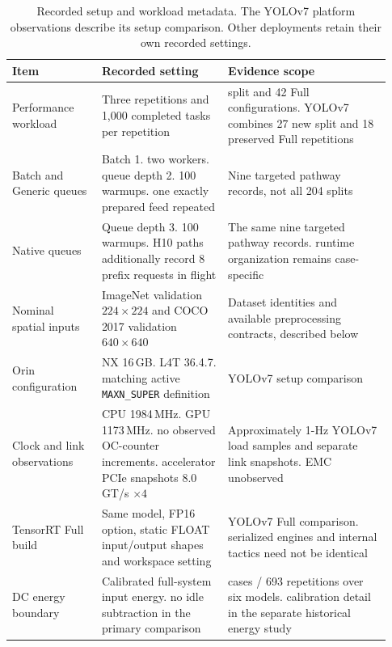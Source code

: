 \begin{table}[t]
\centering\small
\caption{Recorded setup and workload metadata. The YOLOv7 platform observations describe its setup comparison. Other deployments retain their own recorded settings.}
\label{tab:supp-setup}
\setlength{\tabcolsep}{3pt}
\begin{tabular}{@{}>{\raggedright\arraybackslash}p{0.22\linewidth}>{\raggedright\arraybackslash}p{0.31\linewidth}>{\raggedright\arraybackslash}p{0.4\linewidth}@{}}
\toprule
Item & Recorded setting & Evidence scope \\
\midrule
Performance workload & Three repetitions and 1,000 completed tasks per repetition & 204 split and 42 Full configurations. YOLOv7 combines 27 new split and 18 preserved Full repetitions \\
Batch and Generic queues & Batch 1. two workers. queue depth 2. 100 warmups. one exactly prepared feed repeated & Nine targeted pathway records, not all 204 splits \\
Native queues & Queue depth 3. 100 warmups. H10 paths additionally record 8 prefix requests in flight & The same nine targeted pathway records. runtime organization remains case-specific \\
Nominal spatial inputs & ImageNet validation $224\times224$ and COCO 2017 validation $640\times640$ & Dataset identities and available preprocessing contracts, described below \\
Orin configuration & NX 16\,GB. L4T 36.4.7. matching active \texttt{MAXN\_SUPER} definition & YOLOv7 setup comparison \\
Clock and link observations & CPU 1984\,MHz. GPU 1173\,MHz. no observed OC-counter increments. accelerator PCIe snapshots 8.0\,GT/s $\times4$ & Approximately 1-Hz YOLOv7 load samples and separate link snapshots. EMC unobserved \\
TensorRT Full build & Same model, FP16 option, static FLOAT input/output shapes and workspace setting & YOLOv7 Full comparison. serialized engines and internal tactics need not be identical \\
DC energy boundary & Calibrated full-system input energy. no idle subtraction in the primary comparison & 231 cases / 693 repetitions over six models. calibration detail in the separate historical energy study \\
\bottomrule
\end{tabular}
\end{table}
